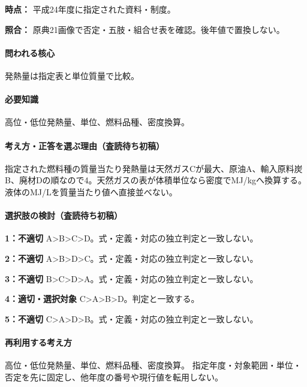 \noindent\textbf{時点：} 平成24年度に指定された資料・制度。\par

\noindent\textbf{照合：} 原典21画像で否定・五肢・組合せ表を確認。後年値で置換しない。\par

\paragraph{問われる核心} 発熱量は指定表と単位質量で比較。

\paragraph{必要知識} 高位・低位発熱量、単位、燃料品種、密度換算。

\paragraph{考え方・正答を選ぶ理由（査読待ち初稿）} 指定された燃料種の質量当たり発熱量は天然ガスCが最大、原油A、輸入原料炭B、廃材Dの順なので4。天然ガスの表が体積単位なら密度でMJ/kgへ換算する。液体のMJ/Lを質量当たり値へ直接並べない。

\paragraph{選択肢の検討（査読待ち初稿）}\mbox{}\par

\noindent\textbf{1：不適切} A>B>C>D。式・定義・対応の独立判定と一致しない。\par

\noindent\textbf{2：不適切} A>B>D>C。式・定義・対応の独立判定と一致しない。\par

\noindent\textbf{3：不適切} B>C>D>A。式・定義・対応の独立判定と一致しない。\par

\noindent\textbf{4：適切・選択対象} C>A>B>D。判定と一致する。\par

\noindent\textbf{5：不適切} C>A>D>B。式・定義・対応の独立判定と一致しない。\par

\paragraph{再利用する考え方} 高位・低位発熱量、単位、燃料品種、密度換算。 指定年度・対象範囲・単位・否定を先に固定し、他年度の番号や現行値を転用しない。

